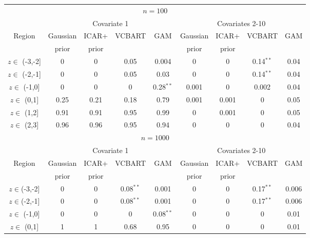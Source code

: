 \begin{table}
\begin{center}
\begin{tabular}{ccccccccc} 
\multicolumn{9}{c}{$n=100$} \\ 
& \multicolumn{4}{c}{Covariate 1} & \multicolumn{4}{c}{Covariates 2-10} \\ 
 Region          & Gaussian &  ICAR+    & VCBART & GAM         & Gaussian &  ICAR+      & VCBART     & GAM  \\
                 & prior    &  prior    &        &                         & prior    &  prior      &            & \\
$z \in $ (-3,-2] & 0        &  0        &0.05    &  0.004      & 0       &  0       & 0.14$^{**}$&  0.04 \\
$z \in $ (-2,-1] & 0        &  0        &0.05    &  0.03       & 0       &  0       & 0.14$^{**}$&  0.04  \\ 
$z \in $  (-1,0] & 0        &  0        & 0      &  0.28$^{**}$ & 0.001   &  0       & 0.002      &  0.04 \\ 
$z \in $   (0,1] & 0.25     &  0.21     &0.18    &  0.79       & 0.001   &  0.001   & 0          &  0.05 \\ 
$z \in $   (1,2] & 0.91     &  0.91     &0.95    &  0.99       & 0       &  0.001   & 0          &  0.05 \\ 
$z \in $   (2,3] & 0.96     &  0.96     &0.95    &  0.94       & 0       &  0       & 0          &  0.04 \\ 
%
\multicolumn{9}{|c|}{$n=1000$} \\ 
& \multicolumn{4}{c}{Covariate 1} & \multicolumn{4}{c}{Covariates 2-10} \\ 
 Region         & Gaussian &  ICAR+  & VCBART     & GAM         & Gaussian & ICAR+& VCBART     & GAM \\
                & prior    &  prior  &          &                       & prior  & prior&            & \\
$z \in $(-3,-2] &   0      & 0       & 0.08$^{**}$  & 0.001       & 0      & 0     & 0.17$^{**}$&   0.006 \\ 
$z \in $(-2,-1] &   0      & 0       & 0.08$^{**}$  & 0.001       & 0     & 0     & 0.17$^{**}$&   0.006 \\ 
$z \in $ (-1,0] &   0      & 0        & 0         & 0.08$^{**}$  & 0    & 0     & 0          &  0.01 \\ 
$z \in $  (0,1] &   1      & 1        & 0.68      & 0.95        & 0     & 0    & 0          &  0.01 \\ 

\end{tabular}
\end{center}
\end{table}
